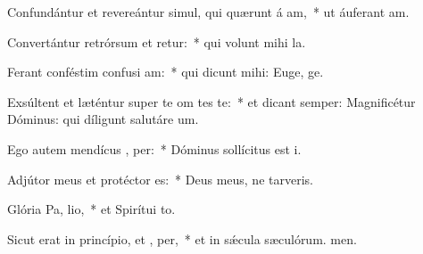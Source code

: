 \item Confundántur et revereántur simul, qui quærunt á am,~* ut áuferant am.
\item Convertántur retrórsum et retur:~* qui volunt mihi la.
\item Ferant conféstim confusi am:~* qui dicunt mihi: Euge, ge.
\item Exsúltent et læténtur super te om tes te:~* et dicant semper: Magnificétur Dóminus: qui díligunt salutáre um.
\item Ego autem mendícus ,  per:~* Dóminus sollícitus est i.
\item Adjútor meus et protéctor   es:~* Deus meus, ne tarveris.
\item Glória Pa,  lio,~* et Spirítui to.
\item Sicut erat in princípio, et ,  per,~* et in sǽcula sæculórum. men.
